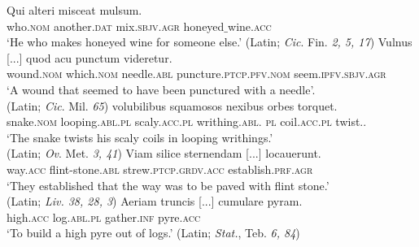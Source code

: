 \documentclass[output=paper,colorlinks,citecolor=brown]{langscibook}
\begin{document}
\ea \label{Latin} \gll Qui alteri misceat mulsum.\\
who.\textsc{nom} another.\textsc{dat} mix.\textsc{sbjv}.\textsc{agr} honeyed$\_$wine.\textsc{acc} \label{Latin1}\\
\glt `He who makes honeyed wine for someone else.' \hfill (Latin; \textit{Cic}. Fin. \textit{2, 5, 17}) 
\ex \gll Vulnus [...] quod acu punctum videretur.\\
wound.\textsc{nom} {} which.\textsc{nom} needle.\textsc{abl} puncture.\textsc{ptcp}.\textsc{pfv}.\textsc{nom} seem.\textsc{ipfv}.\textsc{sbjv}.\textsc{agr} \label{Latin2}\\
\glt `A wound that seemed to have been punctured with a needle'.\\\hfill (Latin; \textit{Cic}. Mil. \textit{65})
\ex \gll [Serpens] volubilibus squamosos nexibus
orbes torquet.\\
snake.\textsc{nom} looping.\textsc{abl}.\textsc{pl} scaly.\textsc{acc}.\textsc{pl} writhing.\textsc{abl}.%
\textsc{pl} coil.\textsc{acc}.\textsc{pl} twist.{\PRS.\AGR} \label{Latin3}\\
\glt `The snake twists his scaly coils in looping writhings.' \\\hfill  (Latin; \textit{Ov}. Met. \textit{3, 41})
\ex \gll Viam silice sternendam [...] locauerunt.\\
way.\textsc{acc} flint-stone.\textsc{abl} strew.\textsc{ptcp}.\textsc{grdv}.\textsc{acc} {} establish.\textsc{prf}.\textsc{agr} \label{Latin4}\\
\glt `They established that the way was to be paved with flint stone.' \\\hfill (Latin; \textit{Liv. 38, 28, 3})
\ex \gll Aeriam truncis [...] cumulare pyram.\\
high.\textsc{acc} log.\textsc{abl}.\textsc{pl} {}
gather.\textsc{inf} pyre.\textsc{acc} \label{Latin5}\\
\glt `To build a high pyre out of logs.' \hfill (Latin; \textit{Stat.}, Teb. \textit{6, 84}) \z
\end{document}
